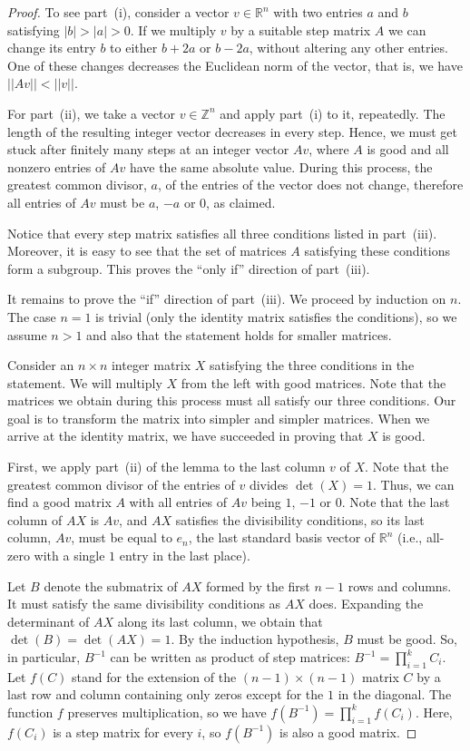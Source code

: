 \documentclass{article}
\theoremstyle{definition}
\newcommand{\R}{\mathbb R}
\newcommand{\Z}{\mathbb Z}
\begin{document}
\begin{proof}
To see part~(i), consider a vector $v\in\R^n$ with two entries $a$ and $b$ satisfying $|b|>|a|>0$. If we multiply $v$ by a suitable step matrix $A$ we can change its entry $b$ to either $b+2a$ or $b-2a$, without altering any other entries. One of these changes decreases the Euclidean norm of the vector, that is, we have $||Av||<||v||.$
\medskip

For part~(ii), we take a vector $v\in\Z^n$ and apply part~(i) to it, repeatedly. The length of the resulting integer vector decreases in every step. Hence, we must get stuck after finitely many steps at an integer vector $Av$, where $A$ is good and all nonzero entries of $Av$ have the same absolute value. During this process, the greatest common divisor, $a$, of the entries of the vector does not change, therefore all entries of $Av$ must be $a$, $-a$ or $0$, as claimed.
\medskip

Notice that every step matrix satisfies all three conditions listed in part~(iii). Moreover, it is easy to see that the set of matrices $A$ satisfying these conditions form a subgroup. This proves the ``only if'' direction of part~(iii).
\medskip

It remains to prove the ``if'' direction of part~(iii). We proceed by induction on $n$. The case $n=1$ is trivial (only the identity matrix satisfies the conditions), so we assume $n>1$ and also that the statement holds for smaller matrices.

\smallskip

Consider an $n\times n$ integer matrix $X$ satisfying the three conditions in the statement. We will multiply $X$ from the left with good matrices. Note that the matrices we obtain during this process must all satisfy our three conditions.
Our goal is to transform the matrix into simpler and simpler matrices. When we arrive at the identity matrix, we have succeeded in proving that $X$ is good.

First, we apply part~(ii) of the lemma to the last column $v$ of $X$. Note that the greatest common divisor of the entries of $v$ divides $\det(X)=1$. Thus, we can find a good matrix $A$ with all entries of $Av$ being $1$, $-1$ or $0$. Note that the last column of $AX$ is $Av$, and $AX$ satisfies the divisibility conditions, so its last column, $Av$, must be equal to $e_n$, the last standard basis vector of $\R^n$ (i.e., all-zero with a single $1$ entry in the last place).

Let $B$ denote the submatrix of $AX$ formed by the first $n-1$ rows and columns. It must satisfy the same divisibility conditions as $AX$ does. Expanding the determinant of $AX$ along its last column, we obtain that $\det(B)=\det(AX)=1.$ By the induction hypothesis, $B$ must be good. So, in particular, $B^{-1}$ can be written as product of step matrices: $B^{-1}=\prod_{i=1}^kC_i$. Let $f(C)$ stand for the extension of the $(n-1)\times(n-1)$ matrix $C$ by a last row and column containing only zeros except for the $1$ in the diagonal. The function $f$ preserves multiplication, so we have $f(B^{-1})=\prod_{i=1}^kf(C_i)$. Here, $f(C_i)$ is a step matrix for every $i$, so $f(B^{-1})$ is also a good matrix.


\end{proof}
\end{document}
